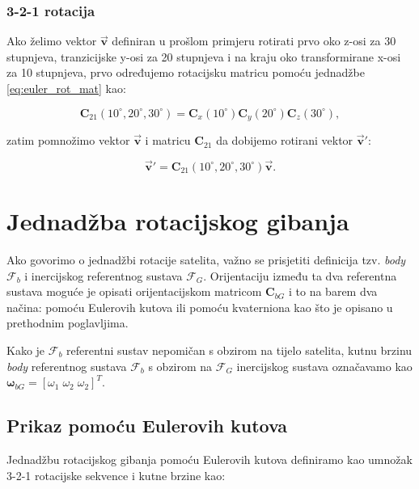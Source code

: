 \documentclass[times, utf8, diplomski, numeric]{templates/template}
\begin{document}
{{{            \subsubsection{3-2-1 rotacija}{
                Ako želimo vektor $\overrightarrow{\textbf{v}}$ definiran u prošlom primjeru rotirati prvo oko z-osi za 30 stupnjeva, tranzicijske y-osi za 20 stupnjeva i na kraju oko transformirane x-osi za 10 stupnjeva, prvo određujemo rotacijsku matricu pomoću jednadžbe \ref{eq:euler_rot_mat} kao:

                \begin{equation}
                \textbf{C}_{21}(10^\circ, 20^\circ, 30^\circ) = \textbf{C}_{x}(10^\circ) \textbf{C}_{y}(20^\circ) \textbf{C}_{z}(30^\circ),
                \end{equation}

                zatim pomnožimo vektor $\overrightarrow{\textbf{v}}$ i matricu $\textbf{C}_{21}$ da dobijemo rotirani vektor $\overrightarrow{\textbf{v}}'$:

                \begin{equation}
                    \overrightarrow{\textbf{v}}' = \textbf{C}_{21}(10^\circ, 20^\circ, 30^\circ) \overrightarrow{\textbf{v}}.
                \end{equation}
            }
        }
    }

    \section{Jednadžba rotacijskog gibanja}{
        Ako govorimo o jednadžbi rotacije satelita, važno se prisjetiti definicija tzv. \emph{body} $\mathcal{F}_b
        $ i inercijskog referentnog sustava $\mathcal{F}_G$. Orijentaciju između ta dva referentna sustava moguće je opisati orijentacijskom matricom $\textbf{C}_{bG}$ i to na barem dva načina: pomoću Eulerovih kutova ili pomoću kvaterniona kao što je opisano u prethodnim poglavljima.

        Kako je $\mathcal{F}_b$ referentni sustav nepomičan s obzirom na tijelo satelita, kutnu brzinu \emph{body} referentnog sustava $\mathcal{F}_b$ s obzirom na $\mathcal{F}_G$ inercijskog sustava označavamo kao $\boldsymbol{\omega}_{bG}=\left[ \omega_1 \; \omega_2 \; \omega_2\right]^T$.

        \subsection{Prikaz pomoću Eulerovih kutova}{
            Jednadžbu rotacijskog gibanja pomoću Eulerovih kutova definiramo kao umnožak 3-2-1 rotacijske sekvence i kutne brzine kao:

}}}
\end{document}
